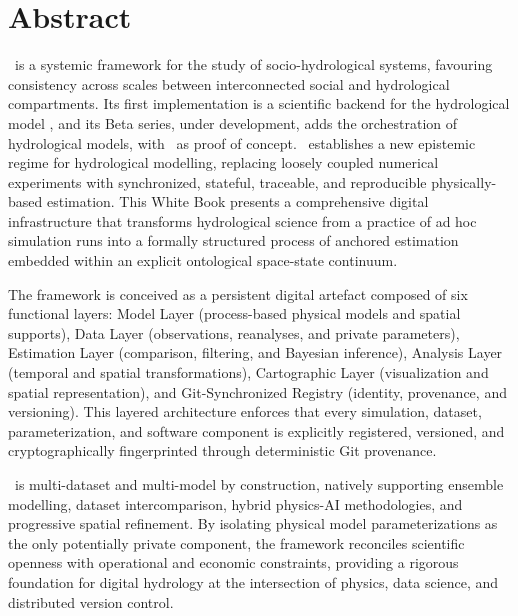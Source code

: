 \chapter*{Abstract}
{}
\fancyhead[LE]{\thepage} 
\fancyhead[RO]{\thepage} 
\fancyfoot[C]{\thepage}

\renewcommand{\headrulewidth}{0.1pt}

\setlength{\parindent}{0cm} %
\setlength{\parskip}{9pt}
\vspace{-1cm}

\htastarget



\hydrot\ is a systemic framework for the study of socio-hydrological systems, favouring consistency across scales between interconnected social and hydrological compartments. Its first implementation is a scientific backend for the hydrological model \cw, and its Beta series, under development, adds the orchestration of hydrological models, with \cw\ as proof of concept. \hydrot\ establishes a new epistemic regime for hydrological modelling, replacing loosely coupled numerical experiments with synchronized, stateful, traceable, and reproducible physically-based estimation. This White Book presents a comprehensive digital infrastructure that transforms hydrological science from a practice of ad hoc simulation runs into a formally structured process of anchored estimation embedded within an explicit ontological space-state continuum.

The framework is conceived as a persistent digital artefact composed of six functional layers: Model Layer (process-based physical models and spatial supports), Data Layer (observations, reanalyses, and private parameters), Estimation Layer (comparison, filtering, and Bayesian inference), Analysis Layer (temporal and spatial transformations), Cartographic Layer (visualization and spatial representation), and Git-Synchronized Registry (identity, provenance, and versioning). This layered architecture enforces that every simulation, dataset, parameterization, and software component is explicitly registered, versioned, and cryptographically fingerprinted through deterministic Git provenance.

\hydrot\ is multi-dataset and multi-model by construction, natively supporting ensemble modelling, dataset intercomparison, hybrid physics-AI methodologies, and progressive spatial refinement. By isolating physical model parameterizations as the only potentially private component, the framework reconciles scientific openness with operational and economic constraints, providing a rigorous foundation for digital hydrology at the intersection of physics, data science, and distributed version control.

